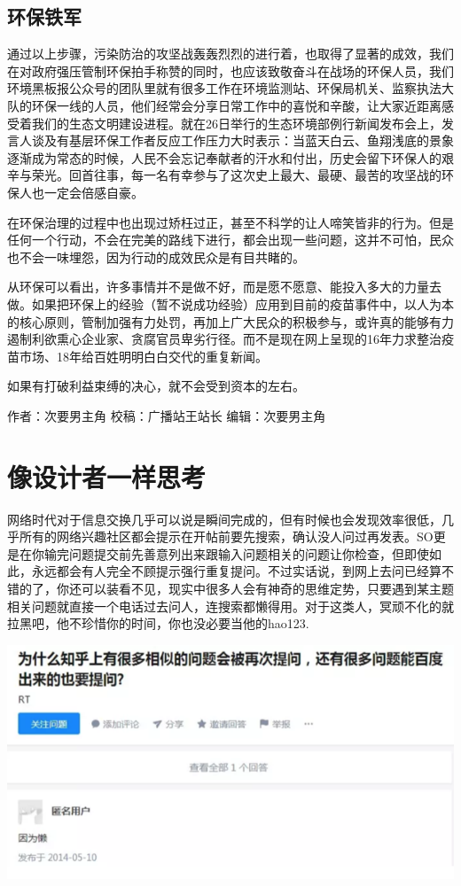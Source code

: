 \documentclass[]{book}
\begin{document}
\subsection{环保铁军}

通过以上步骤，污染防治的攻坚战轰轰烈烈的进行着，也取得了显著的成效，我们在对政府强压管制环保拍手称赞的同时，也应该致敬奋斗在战场的环保人员，我们环境黑板报公众号的团队里就有很多工作在环境监测站、环保局机关、监察执法大队的环保一线的人员，他们经常会分享日常工作中的喜悦和辛酸，让大家近距离感受着我们的生态文明建设进程。就在26日举行的生态环境部例行新闻发布会上，发言人谈及有基层环保工作者反应工作压力大时表示：当蓝天白云、鱼翔浅底的景象逐渐成为常态的时候，人民不会忘记奉献者的汗水和付出，历史会留下环保人的艰辛与荣光。回首往事，每一名有幸参与了这次史上最大、最硬、最苦的攻坚战的环保人也一定会倍感自豪。

在环保治理的过程中也出现过矫枉过正，甚至不科学的让人啼笑皆非的行为。但是任何一个行动，不会在完美的路线下进行，都会出现一些问题，这并不可怕，民众也不会一味埋怨，因为行动的成效民众是有目共睹的。

从环保可以看出，许多事情并不是做不好，而是愿不愿意、能投入多大的力量去做。如果把环保上的经验（暂不说成功经验）应用到目前的疫苗事件中，以人为本的核心原则，管制加强有力处罚，再加上广大民众的积极参与，或许真的能够有力遏制利欲熏心企业家、贪腐官员卑劣行径。而不是现在网上呈现的16年力求整治疫苗市场、18年给百姓明明白白交代的重复新闻。

如果有打破利益束缚的决心，就不会受到资本的左右。

作者：次要男主角 校稿：广播站王站长 编辑：次要男主角

\section{像设计者一样思考}

网络时代对于信息交换几乎可以说是瞬间完成的，但有时候也会发现效率很低，几乎所有的网络兴趣社区都会提示在开帖前要先搜索，确认没人问过再发表。SO更是在你输完问题提交前先善意列出来跟输入问题相关的问题让你检查，但即使如此，永远都会有人完全不顾提示强行重复提问。不过实话说，到网上去问已经算不错的了，你还可以装看不见，现实中很多人会有神奇的思维定势，只要遇到某主题相关问题就直接一个电话过去问人，连搜索都懒得用。对于这类人，冥顽不化的就拉黑吧，他不珍惜你的时间，你也没必要当他的hao123.

\includegraphics[width=8.33in]{images/sheji1}
\end{document}
